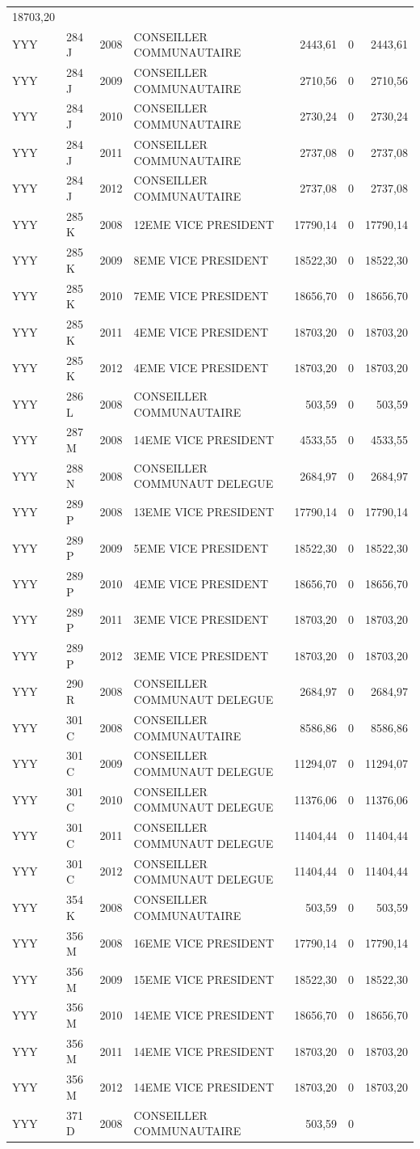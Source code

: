 \begin{longtable}[]{@{}llrlrrr@{}}
18703,20\tabularnewline
YYY & 284 J & 2008 & CONSEILLER COMMUNAUTAIRE & 2443,61 & 0 &
2443,61\tabularnewline
YYY & 284 J & 2009 & CONSEILLER COMMUNAUTAIRE & 2710,56 & 0 &
2710,56\tabularnewline
YYY & 284 J & 2010 & CONSEILLER COMMUNAUTAIRE & 2730,24 & 0 &
2730,24\tabularnewline
YYY & 284 J & 2011 & CONSEILLER COMMUNAUTAIRE & 2737,08 & 0 &
2737,08\tabularnewline
YYY & 284 J & 2012 & CONSEILLER COMMUNAUTAIRE & 2737,08 & 0 &
2737,08\tabularnewline
YYY & 285 K & 2008 & 12EME VICE PRESIDENT & 17790,14 & 0 &
17790,14\tabularnewline
YYY & 285 K & 2009 & 8EME VICE PRESIDENT & 18522,30 & 0 &
18522,30\tabularnewline
YYY & 285 K & 2010 & 7EME VICE PRESIDENT & 18656,70 & 0 &
18656,70\tabularnewline
YYY & 285 K & 2011 & 4EME VICE PRESIDENT & 18703,20 & 0 &
18703,20\tabularnewline
YYY & 285 K & 2012 & 4EME VICE PRESIDENT & 18703,20 & 0 &
18703,20\tabularnewline
YYY & 286 L & 2008 & CONSEILLER COMMUNAUTAIRE & 503,59 & 0 &
503,59\tabularnewline
YYY & 287 M & 2008 & 14EME VICE PRESIDENT & 4533,55 & 0 &
4533,55\tabularnewline
YYY & 288 N & 2008 & CONSEILLER COMMUNAUT DELEGUE & 2684,97 & 0 &
2684,97\tabularnewline
YYY & 289 P & 2008 & 13EME VICE PRESIDENT & 17790,14 & 0 &
17790,14\tabularnewline
YYY & 289 P & 2009 & 5EME VICE PRESIDENT & 18522,30 & 0 &
18522,30\tabularnewline
YYY & 289 P & 2010 & 4EME VICE PRESIDENT & 18656,70 & 0 &
18656,70\tabularnewline
YYY & 289 P & 2011 & 3EME VICE PRESIDENT & 18703,20 & 0 &
18703,20\tabularnewline
YYY & 289 P & 2012 & 3EME VICE PRESIDENT & 18703,20 & 0 &
18703,20\tabularnewline
YYY & 290 R & 2008 & CONSEILLER COMMUNAUT DELEGUE & 2684,97 & 0 &
2684,97\tabularnewline
YYY & 301 C & 2008 & CONSEILLER COMMUNAUTAIRE & 8586,86 & 0 &
8586,86\tabularnewline
YYY & 301 C & 2009 & CONSEILLER COMMUNAUT DELEGUE & 11294,07 & 0 &
11294,07\tabularnewline
YYY & 301 C & 2010 & CONSEILLER COMMUNAUT DELEGUE & 11376,06 & 0 &
11376,06\tabularnewline
YYY & 301 C & 2011 & CONSEILLER COMMUNAUT DELEGUE & 11404,44 & 0 &
11404,44\tabularnewline
YYY & 301 C & 2012 & CONSEILLER COMMUNAUT DELEGUE & 11404,44 & 0 &
11404,44\tabularnewline
YYY & 354 K & 2008 & CONSEILLER COMMUNAUTAIRE & 503,59 & 0 &
503,59\tabularnewline
YYY & 356 M & 2008 & 16EME VICE PRESIDENT & 17790,14 & 0 &
17790,14\tabularnewline
YYY & 356 M & 2009 & 15EME VICE PRESIDENT & 18522,30 & 0 &
18522,30\tabularnewline
YYY & 356 M & 2010 & 14EME VICE PRESIDENT & 18656,70 & 0 &
18656,70\tabularnewline
YYY & 356 M & 2011 & 14EME VICE PRESIDENT & 18703,20 & 0 &
18703,20\tabularnewline
YYY & 356 M & 2012 & 14EME VICE PRESIDENT & 18703,20 & 0 &
18703,20\tabularnewline
YYY & 371 D & 2008 & CONSEILLER COMMUNAUTAIRE & 503,59 & 0 &

\end{longtable}
